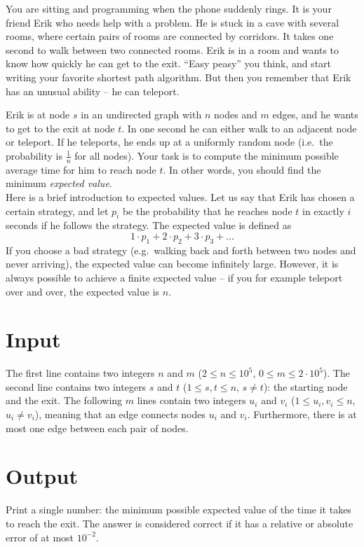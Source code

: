 You are sitting and programming when the phone suddenly rings. It is your friend Erik who needs help with a problem.
He is stuck in a cave with several rooms, where certain pairs of rooms are connected by corridors.
It takes one second to walk between two connected rooms. Erik is in a room and wants to know
how quickly he can get to the exit. ``Easy peasy'' you think, and start writing
your favorite shortest path algorithm. But then you remember that Erik has an unusual ability -- he can teleport.

Erik is at node $s$ in an undirected graph with $n$ nodes and $m$ edges, and he wants to get to the exit at node $t$. In one second he can either walk to
an adjacent node or teleport. If he teleports, he ends up at a uniformly random node (i.e.\ the probability is $\frac{1}{n}$ for all nodes).
Your task is to compute the minimum possible average time for him to reach node $t$. In other words, you should find the minimum \textit{expected value}.\\

Here is a brief introduction to expected values. Let us say that Erik has chosen a certain strategy, and let $p_i$ be the probability that he
reaches node $t$ in exactly $i$ seconds if he follows the strategy. The expected value is defined as
$$1\cdot p_1 + 2\cdot p_2 + 3\cdot p_3 + ...$$
If you choose a bad strategy (e.g.\ walking back and forth between two nodes and never arriving), the expected value can become infinitely large.
However, it is always possible to achieve a finite expected value -- if you for example teleport over and over, the expected value is $n$.

\section*{Input}
The first line contains two integers $n$ and $m$ ($2 \leq n \leq 10^5$, $0 \leq m \leq 2\cdot 10^5$).
The second line contains two integers $s$ and $t$ ($1 \leq s,t \leq n$, $s \neq t$): the starting node and the exit.
The following $m$ lines contain two integers $u_i$ and $v_i$ ($1 \leq u_i, v_i \leq n$, $u_i \neq v_i$),
meaning that an edge connects nodes $u_i$ and $v_i$. Furthermore, there is at most one edge between each pair of nodes.

\section*{Output}
Print a single number: the minimum possible expected value of the time it takes to reach the exit.
The answer is considered correct if it has a relative or absolute error of at most $10^{-2}$.

